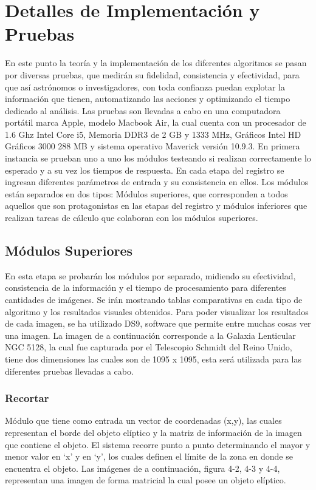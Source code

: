 \section{Detalles de Implementación y Pruebas}

En este punto la teoría y la implementación de los diferentes algoritmos se
pasan por diversas pruebas, que medirán su fidelidad, consistencia y
efectividad, para
que así astrónomos o investigadores, con toda confianza puedan explotar la
información
que tienen, automatizando las acciones y optimizando el tiempo dedicado al
análisis.
Las pruebas son llevadas a cabo en una computadora portátil marca Apple,
modelo Macbook Air, la cual cuenta con un procesador de 1.6 Ghz Intel Core i5,
Memoria DDR3 de 2 GB y 1333 MHz, Gráficos Intel HD Gráficos 3000 288 MB y
sistema operativo Maverick versión 10.9.3.
En primera instancia se prueban uno a uno los módulos testeando si realizan
correctamente lo esperado y a su vez los tiempos de respuesta. En cada etapa del
registro
se ingresan diferentes parámetros de entrada y su consistencia en ellos. Los
módulos
están separados en dos tipos: Módulos superiores, que corresponden a todos
aquellos
que son protagonistas en las etapas del registro y módulos inferiores que
realizan tareas
de cálculo que colaboran con los módulos superiores.

\subsection{Módulos Superiores}

En esta etapa se probarán los módulos por separado, midiendo su
efectividad, consistencia de la información y el tiempo de procesamiento para
diferentes
cantidades de imágenes. Se irán mostrando tablas comparativas en cada tipo de
algoritmo y los resultados visuales obtenidos. Para poder visualizar los
resultados de
cada imagen, se ha utilizado DS9, software que permite entre muchas cosas ver
una
imagen. La imagen de a continuación corresponde a la Galaxia Lenticular NGC
5128, la
cual fue capturada por el Telescopio Schmidt del Reino Unido, tiene dos
dimensiones
las cuales son de 1095 x 1095, esta será utilizada para las diferentes pruebas
llevadas a
cabo.

\subsubsection{Recortar}
Módulo que tiene como entrada un vector de coordenadas (x,y), las cuales
representan el borde del objeto elíptico y la matriz de información de la imagen
que contiene el objeto. El sistema recorre punto a punto determinando el mayor y
menor valor en ‘x’ y en ‘y’, los cuales definen el límite de la zona en donde se
encuentra el objeto. Las imágenes de a continuación, figura 4-2, 4-3 y 4-4,
representan una imagen de forma matricial la cual posee un objeto elíptico.


